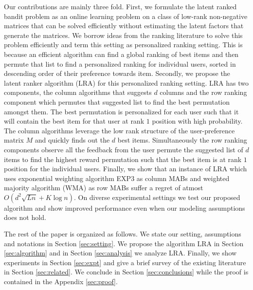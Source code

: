 Our contributions are mainly three fold. First, we formulate the latent ranked bandit problem as an online learning problem on a class of low-rank non-negative matrices that can be solved efficiently without estimating the latent factors that generate the matrices. We borrow ideas from the ranking literature to solve this problem efficiently and term this setting as personalized ranking setting. This is because an efficient algorithm can find a global ranking of best items and then permute that list to find a personalized ranking for individual users, sorted in descending order of their preference towards item. Secondly, we propose the latent ranker algorithm (LRA) for this personalized ranking setting. LRA has two components, the column algorithms that suggests $d$ columns and the row ranking component which permutes that suggested list to find the best permutation amongst them. The best permutation is personalized for each user such that it will contain the best item for that user at rank $1$ position with high probability. The column algorithms leverage the low rank structure of the user-preference matrix $M$ and quickly finds out the $d$ best items. Simultaneously the row ranking components observe all the feedback from the user permute the suggested list of $d$ items to find the highest reward permutation such that the best item is at rank $1$ position for the individual users. Finally, we show that an instance of LRA which uses exponential weighting algorithm EXP3 as column MABs and weighted majority algorithm (WMA) as row MABs suffer a regret of atmost $O\left(d^2\sqrt{L n} + K \log n\right)$. On diverse experimental settings we test our proposed algorithm and show improved performance even when our modeling assumptions does not hold.

	The rest of the paper is organized as follows. We state our setting, assumptions and notations in Section \ref{sec:setting}. We propose the algorithm LRA in Section \ref{sec:algorithm} and in Section \ref{sec:analysis} we analyze LRA. Finally, we show experiments in Section \ref{sec:expt} and give a brief survey of the existing literature in Section \ref{sec:related}. We conclude in Section \ref{sec:conclusions} while the proof is contained in the Appendix \ref{sec:proof}.